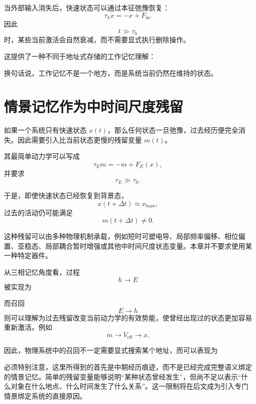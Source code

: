 当外部输入消失后，快速状态可以通过本征弛豫恢复：
\[
\tau_h \dot{x}
=
-x+F_{\mathrm{in}}.
\]
因此
\[
t\gg\tau_h
\]
时，某些当前激活会自然衰减，而不需要显式执行删除操作。

这提供了一种不同于地址式存储的工作记忆理解：
\begin{statementbox}
\centering
{}
\end{statementbox}

换句话说，工作记忆不是一个地方，而是系统当前仍然在维持的状态。

\section{情景记忆作为中时间尺度残留}

如果一个系统只有快速状态 $x(t)$，那么任何状态一旦弛豫，过去经历便完全消失。因此需要引入比当前状态更慢的残留变量 $m(t)$。

其最简单动力学可以写成
\[
\tau_E \dot m
=
-m+
F_E(x),
\]
并要求
\[
\tau_E\gg\tau_h.
\]

于是，即使快速状态已经恢复到背景态，
\[
x(t+\Delta t)\approx x_{\mathrm{base}},
\]
过去的活动仍可能满足
\[
m(t+\Delta t)\neq 0.
\]

这种残留可以由多种物理机制承载，例如短时可塑电导、局部频率偏移、相位偏置、亚稳态、局部耦合暂时增强或其他中时间尺度状态变量。本章并不要求使用某一种特定器件。

从三相记忆角度看，过程
\[
h\rightarrow E
\]
被实现为
\begin{statementbox}
\centering
{}
\end{statementbox}

而召回
\[
E\rightarrow h
\]
则可以理解为过去残留改变当前动力学的有效势能，使曾经出现过的状态更加容易重新激活。例如
\[
m
\rightarrow
V_{\mathrm{eff}}
\rightarrow
x.
\]

因此，物理系统中的召回不一定需要显式搜索某个地址，而可以表现为
\begin{statementbox}
\centering
{}
\end{statementbox}

必须特别注意，这里所得到的首先是中期经历痕迹，而不是已经完成完整语义绑定的情景记忆。简单的残留变量能够说明“某种状态曾经发生”，但尚不足以表示“什么对象在什么地点、什么时间发生了什么关系”。这一限制将在后文成为引入专门情景绑定系统的直接原因。

